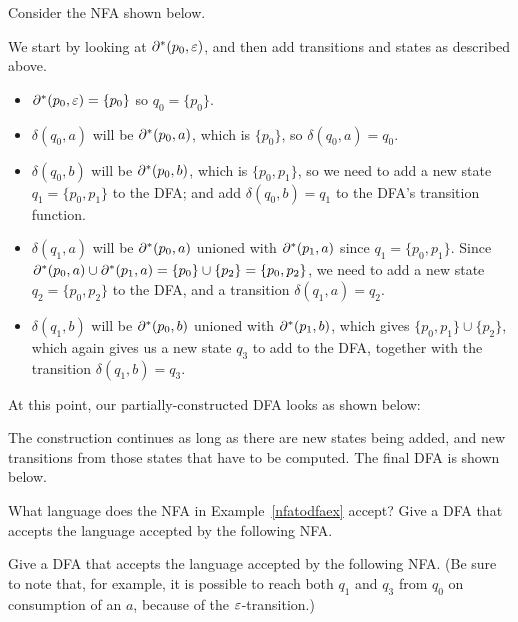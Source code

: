 \begin{example}\label{nfatodfaex}
Consider the NFA shown below.


We start by looking at $\partial^*(p_0, \varepsilon)$, and then add transitions and
states as described above.
\begin{itemize}
\item
$\partial^*(p_0, \varepsilon) = \{p_0\}$ so $q_0 = \{p_0\}$.

\item
$\delta(q_0,a)$ will be $\partial^*(p_0,a)$, which is $\{p_0\}$, 
so $\delta(q_0,a) = q_0$.

\item
$\delta(q_0,b)$ will be $\partial^*(p_0,b)$, which is $\{p_0, p_1\}$,
so we need to add a new state
$q_1 = \{p_0, p_1\}$ to the DFA; and add $\delta(q_0,b) = q_1$ to the DFA's
transition function.

\item
$\delta(q_1,a)$ will be $\partial^*(p_0,a)$ unioned with $\partial^*(p_1,a)$ since
$q_1 = \{p_0, p_1\}$.  Since $\partial^*(p_0,a) \cup \partial^*(p_1,a) = \{p_0\} \cup
\{p_2\} = \{p_0,p_2\}$, we need to add a new state $q_2 = \{p_0, p_2\}$ to the
DFA, and a transition $\delta(q_1,a) = q_2$.

\item 
$\delta(q_1,b)$ will be $\partial^*(p_0,b)$ unioned with $\partial^*(p_1,b)$, which
gives $\{p_0, p_1\} \cup \{p_2\}$, which again gives us a new state $q_3$ to add to
the DFA, together with the transition $\delta(q_1,b) = q_3$.
\end{itemize}

At this point, our partially-constructed DFA looks as shown below:


The construction continues as long as there are new states being added, and new
transitions from those states that have to be computed.
The final DFA is shown below.


\end{example}


\begin{exercises}
\problem What language does the NFA in Example~\ref{nfatodfaex} accept?
\problem Give a DFA that accepts the language accepted by the 
following NFA.

\fsafig{3ex}

\problem Give a DFA that accepts the language accepted by the following NFA.
(Be sure to note that, for example, it is possible to reach both $q_1$ and
$q_3$ from $q_0$ on consumption of an $a$, because of the 
$\varepsilon$-transition.)

\fsafig{4ex}


\end{exercises}



